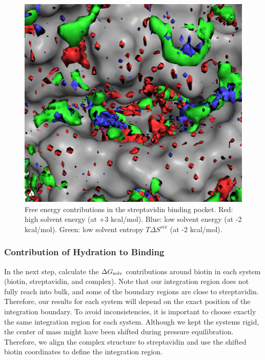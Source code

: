 \documentclass[9pt,tutorial]{livecoms}
\newcommand{\dgsolv}{\Delta G_\textup{solv}}
\begin{document}
\begin{figure}
	\centering
	\includegraphics[width=0.8\linewidth]{figures/binding_pocket_S_-2_E_-2_E_3.png}
	\caption{Free energy contributions in the streptavidin binding pocket. Red: high solvent energy (at +3 kcal/mol). Blue: low solvent energy (at -2 kcal/mol). Green: low solvent entropy $T\Delta S^{six}$ (at -2 kcal/mol).}\label{fig_binding_pocket_pymol}
\end{figure}


\subsubsection{Contribution of Hydration to Binding}
\label{sec:binding_contributions}
In the next step, calculate the $\dgsolv$ contributions around biotin in each system (biotin, streptavidin, and complex).
Note that our integration region does not fully reach into bulk, and some of the boundary regions are close to streptavidin. 
Therefore, our results for each system will depend on the exact position of the integration boundary. 
To avoid inconsistencies, it is important to choose exactly the same integration region for each system.
Although we kept the systems rigid, the center of mass might have been shifted during pressure equilibration.
Therefore, we align the complex structure to streptavidin and use the shifted biotin coordinates to define the integration region.
\end{document}
